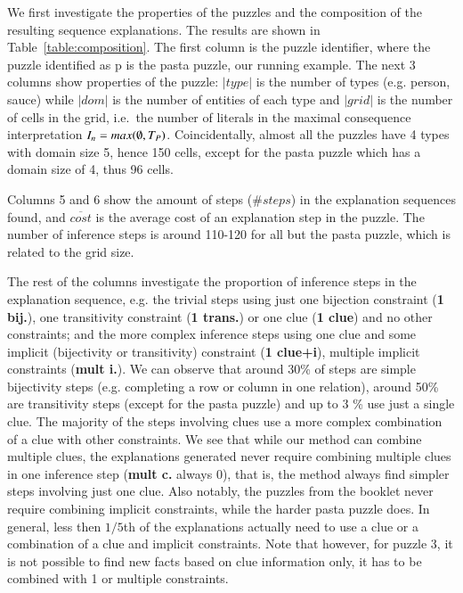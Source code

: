 We first investigate the properties of the puzzles and the composition of the resulting sequence explanations. The results are shown in Table~\ref{table:composition}. The first column is the puzzle identifier, where the puzzle identified as p is the pasta puzzle, our running example. 
The next 3 columns show properties of the puzzle:
$|type|$ is the number of types (e.g. person, sauce) while $|dom|$ is the number of entities of each type and $|grid|$ is the number of cells in the grid, i.e.\ the number of literals in the maximal consequence interpretation $I_n=max(\emptyset, T_P)$.
Coincidentally, almost all the puzzles have 4 types with domain size 5,  hence 150 cells, except for the pasta puzzle which has a domain size of 4, thus 96 cells.

Columns 5 and 6 show the amount of steps ($\# steps$) in the explanation sequences found, and $\overline{cost}$ is the average cost of an explanation step in the puzzle. The number of inference steps is around 110-120 for all but the pasta puzzle, which is related to the grid size.

The rest of the columns investigate the proportion of inference steps in the explanation sequence, e.g. the trivial steps using just one bijection constraint (\textbf{1 bij.}), one transitivity constraint (\textbf{1 trans.}) or one clue (\textbf{1 clue}) and no other constraints; and the more complex inference steps using one clue and some implicit (bijectivity or transitivity) constraint (\textbf{1 clue+i}), multiple implicit constraints (\textbf{mult i.}). 
We can observe that around 30\% of steps are simple bijectivity steps (e.g. completing a row or column in one relation), around 50\% are transitivity steps (except for the pasta puzzle) and up to 3 \% use just a single clue. 
The majority of the steps involving clues use a more complex combination of a clue with other constraints. 
We see that while our method can combine multiple clues, the explanations generated never require combining multiple clues in one inference step (\textbf{mult c.} always 0), that is, the method always find simpler steps involving just one clue. 
Also notably, the puzzles from the booklet never require combining implicit constraints, while the harder pasta puzzle does. 
In general, less then $1/5$th of the explanations actually need to use a clue or a combination of a clue and implicit constraints.
Note that however, for puzzle 3, it is not possible to find new facts based on clue information only, it has to be combined with 1 or multiple constraints.

